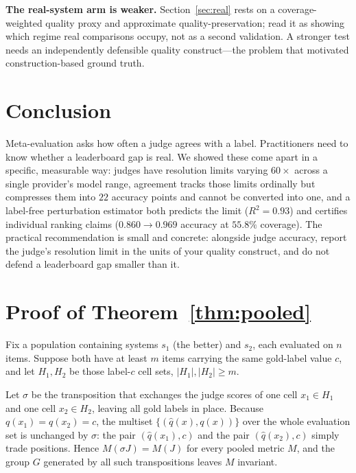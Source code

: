 \documentclass{article}
\theoremstyle{plain}
\theoremstyle{definition}
\newcommand{\qhat}{\hat{q}}
\begin{document}
\textbf{The real-system arm is weaker.} Section~\ref{sec:real} rests on a coverage-weighted
quality proxy and approximate quality-preservation; read it as showing which regime real
comparisons occupy, not as a second validation. A stronger test needs an independently
defensible quality construct---the problem that motivated construction-based ground truth.

\section{Conclusion}

Meta-evaluation asks how often a judge agrees with a label. Practitioners need to know whether
a leaderboard gap is real. We showed these come apart in a specific, measurable way: judges
have resolution limits varying $60\times$ across a single provider's model range, agreement
tracks those limits ordinally but compresses them into $22$ accuracy points and cannot be
converted into one, and a label-free perturbation estimator both predicts the limit
($R^2=0.93$) and certifies individual ranking claims ($0.860\to0.969$ accuracy at $55.8\%$
coverage). The practical recommendation is small and concrete: alongside judge accuracy,
report the judge's resolution limit in the units of your quality construct, and do not defend a
leaderboard gap smaller than it.





\appendix

\section{Proof of Theorem~\ref{thm:pooled}}
\label{app:proofs}

Fix a population containing systems $s_1$ (the better) and $s_2$, each evaluated on $n$
items. Suppose both have at least $m$ items carrying the same gold-label value $c$, and let
$H_1, H_2$ be those label-$c$ cell sets, $|H_1|,|H_2|\ge m$.

Let $\sigma$ be the transposition that exchanges the judge scores of one cell $x_1\in H_1$
and one cell $x_2\in H_2$, leaving all gold labels in place. Because $q(x_1)=q(x_2)=c$, the
multiset $\{(\qhat(x),q(x))\}$ over the whole evaluation set is unchanged by $\sigma$:
the pair $(\qhat(x_1),c)$ and the pair $(\qhat(x_2),c)$ simply trade positions. Hence
$M(\sigma J)=M(J)$ for every pooled metric $M$, and the group $G$ generated by all such
transpositions leaves $M$ invariant.
\end{document}
